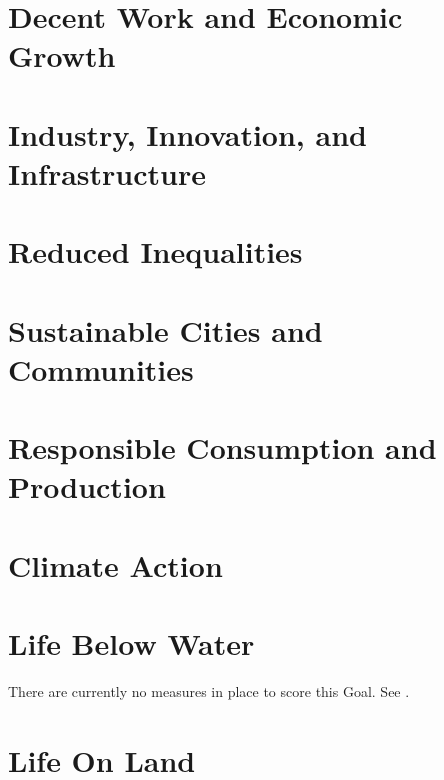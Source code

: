 \documentclass[12pt]{article}
\begin{document}
\section{Decent Work and Economic Growth}



\section{Industry, Innovation, and Infrastructure}



\section{Reduced Inequalities}



\section{Sustainable Cities and Communities}



\section{Responsible Consumption and Production}



\section{Climate Action}



\section{Life Below Water}
There are currently no measures in place to score this Goal. See .
\clearpage

\section{Life On Land}


\end{document}

